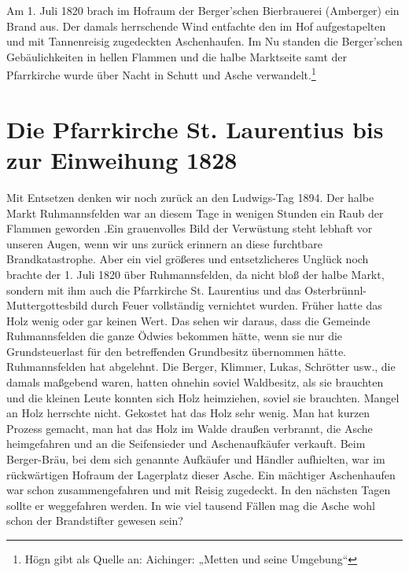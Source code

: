 \documentclass[12pt,a4paper]{book}
\begin{document}
Am 1. Juli 1820 brach im Hofraum der Berger'schen Bierbrauerei (Amberger) ein
Brand aus. Der damals herrschende Wind entfachte den im Hof aufgestapelten und
mit Tannenreisig zugedeckten Aschenhaufen. Im Nu standen die Berger'schen
Gebäulichkeiten in hellen Flammen und die halbe Marktseite samt der Pfarrkirche
wurde über Nacht in Schutt und Asche verwandelt.\footnote{Högn gibt als Quelle
an: Aichinger: „Metten und seine Umgebung“}

\section[bis zur Einweihung 1828]{Die Pfarrkirche St. Laurentius bis zur
Einweihung 1828\protect\footnotemark{}\protect{}}

Mit Entsetzen denken wir noch zurück an den Ludwigs-Tag 1894. Der halbe Markt
Ruhmannsfelden war an diesem Tage in wenigen Stunden ein Raub der Flammen
geworden .Ein grauenvolles Bild der Verwüstung steht lebhaft vor unseren Augen,
wenn wir uns zurück erinnern an diese furchtbare Brandkatastrophe. Aber ein viel
größeres und entsetzlicheres Unglück noch brachte der 1. Juli 1820 über
Ruhmannsfelden, da nicht bloß der halbe Markt, sondern mit ihm auch die
Pfarrkirche St. Laurentius und das Osterbrünnl-Muttergottesbild durch Feuer
vollständig vernichtet wurden. Früher hatte das Holz wenig oder gar keinen Wert.
Das sehen wir daraus, dass die Gemeinde Ruhmannsfelden die ganze Ödwies bekommen
hätte, wenn sie nur die Grundsteuerlast für den betreffenden Grundbesitz
übernommen hätte. Ruhmannsfelden hat abgelehnt. Die Berger, Klimmer, Lukas,
Schrötter usw., die damals maßgebend waren, hatten ohnehin soviel Waldbesitz,
als sie brauchten und die kleinen Leute konnten sich Holz heimziehen, soviel sie
brauchten. Mangel an Holz herrschte nicht. Gekostet hat das Holz sehr wenig. Man
hat kurzen Prozess gemacht, man hat das Holz im Walde draußen verbrannt, die
Asche heimgefahren und an die Seifensieder und Aschenaufkäufer verkauft. Beim
Berger-Bräu, bei dem sich genannte Aufkäufer und Händler aufhielten, war im
rückwärtigen Hofraum der Lagerplatz dieser Asche. Ein mächtiger Aschenhaufen war
schon zusammengefahren und mit Reisig zugedeckt. In den nächsten Tagen sollte er
weggefahren werden. In wie viel tausend Fällen mag die Asche wohl schon der
Brandstifter gewesen sein?
\end{document}
